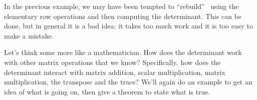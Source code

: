 \medskip

In the previous example, we may have been tempted to ``rebuild'' \tta\ using the elementary row operations and then computing the determinant. This can be done, but in general it is a bad idea; it takes too much work and it is too easy to make a mistake. 


Let's think some more like a mathematician. How does the determinant work with other matrix operations that we know? Specifically, how does the determinant interact with matrix addition, scalar multiplication, matrix multiplication, the transpose and the trace? We'll again do an example to get an idea of what is going on, then give a theorem to state what is true.

\medskip

